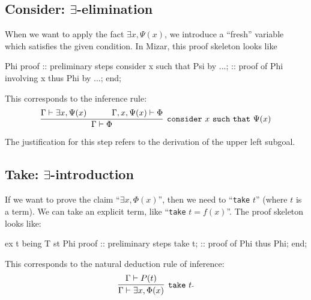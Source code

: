 \subsection{Consider: $\exists$-elimination}
When we want to apply the fact $\exists x,\Psi(x)$, we introduce a
``fresh'' variable which satisfies the given condition. In Mizar, this
proof skeleton looks like
\begin{mizar}
Phi
proof
  :: preliminary steps
  consider x such that Psi by ...;
  :: proof of Phi involving x
  thus Phi by ...;
end;
\end{mizar}%
This corresponds to the inference rule:
\begin{equation}
\vcenter{\infer[\mathtt{consider}~x~\mathtt{such~that}~\Psi(x)]{\Gamma\vdash\Phi}{%
  \Gamma\vdash\exists x,\Psi(x)
  &\qquad\Gamma,x,\Psi(x)\vdash\Phi}}
\end{equation}{
The justification for this step refers to the derivation of the upper
left subgoal.

\subsection{Take: $\exists$-introduction}
If we want to prove the claim ``$\exists x,\Phi(x)$'', then we need to
``\lstinline{take} $t$'' (where $t$ is a term). We can take an explicit term,
like ``\lstinline{take} $t = f(x)$''. The proof skeleton looks like:
\begin{mizar}
ex t being T st Phi
proof
  :: preliminary steps
  take t;
  :: proof of Phi
  thus Phi;
end;
\end{mizar}%
This corresponds to the natural deduction rule of inference:
\begin{equation}
  \vcenter{\infer[\mathtt{take}~t]{\Gamma\vdash\exists x,\Phi(x)}{\Gamma\vdash P(t)}}.
\end{equation}

}
